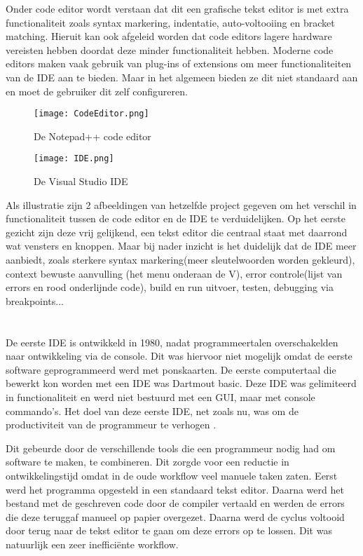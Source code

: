 Onder code editor wordt verstaan dat dit een grafische tekst editor is met extra functionaliteit zoals syntax markering, indentatie, auto-voltooiing en bracket matching. Hieruit kan ook afgeleid worden dat code editors lagere hardware vereisten hebben doordat deze minder functionaliteit hebben. Moderne code editors maken vaak gebruik van plug-ins of extensions om meer functionaliteiten van de IDE aan te bieden. Maar in het algemeen bieden ze dit niet standaard aan en moet de gebruiker dit zelf configureren.

\begin{figure}[h!]
    \texttt{[image: CodeEditor.png]}
    \caption{De Notepad++ code editor}
    \label{fig:codeEditor}
\end{figure}

\begin{figure}[h!]
    \texttt{[image: IDE.png]}
    \caption{De Visual Studio IDE}
    \label{fig:IDE}
\end{figure}

Als illustratie zijn 2 afbeeldingen van hetzelfde project gegeven om het verschil in functionaliteit tussen de code editor en de IDE te verduidelijken. Op het eerste gezicht zijn deze vrij gelijkend, een tekst editor die centraal staat met daarrond wat vensters en knoppen. Maar bij nader inzicht is het duidelijk dat de IDE meer aanbiedt, zoals sterkere syntax markering(meer sleutelwoorden worden gekleurd), context bewuste aanvulling (het menu onderaan de V), error controle(lijst van errors en rood onderlijnde code), build en run uitvoer, testen, debugging via breakpoints...

\section{}
\label{sec:IDE-ontstaan}

De eerste IDE is ontwikkeld in 1980, nadat programmeertalen overschakelden naar ontwikkeling via de console. Dit was hiervoor niet mogelijk omdat de eerste software geprogrammeerd werd met ponskaarten. De eerste computertaal die bewerkt kon worden met een IDE was Dartmout basic. Deze IDE was gelimiteerd in functionaliteit en werd niet bestuurd met een GUI, maar met console commando's. Het doel van deze eerste IDE, net zoals nu, was om de productiviteit van de programmeur te verhogen \autocite{JAXenter2018}.

Dit gebeurde door de verschillende tools die een programmeur nodig had om software te maken, te combineren. Dit zorgde voor een reductie in ontwikkelingstijd omdat in de oude workflow veel manuele taken zaten. Eerst werd het programma opgesteld in een standaard tekst editor. Daarna werd het bestand met de geschreven code door de compiler vertaald en werden de errors die deze teruggaf manueel op papier overgezet. Daarna werd de cyclus voltooid door terug naar de tekst editor te gaan om deze errors op te lossen. Dit was natuurlijk een zeer inefficiënte workflow.

